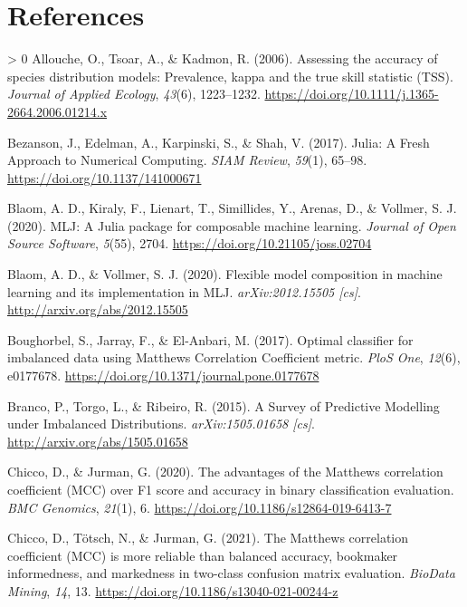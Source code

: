 \documentclass[11pt]{article}
\newlength{\cslhangindent}
\newenvironment{CSLReferences}[3] %
 {%
  \setlength{\parindent}{0pt}
  \ifodd #1 \everypar{\setlength{\hangindent}{\cslhangindent}}\ignorespaces\fi
  \ifnum #2 > 0
  \setlength{\parskip}{#2\baselineskip}
  \fi
 }%
 {}
\begin{document}
\hypertarget{references}{%
\section*{References}\label{references}}

\hypertarget{refs}{}
\begin{CSLReferences}{1}{0}
\leavevmode\hypertarget{ref-Allouche2006AssAcc}{}%
Allouche, O., Tsoar, A., \& Kadmon, R. (2006). Assessing the accuracy of
species distribution models: Prevalence, kappa and the true skill
statistic (TSS). \emph{Journal of Applied Ecology}, \emph{43}(6),
1223--1232. \url{https://doi.org/10.1111/j.1365-2664.2006.01214.x}

\leavevmode\hypertarget{ref-Bezanson2017JulFre}{}%
Bezanson, J., Edelman, A., Karpinski, S., \& Shah, V. (2017). Julia: A
Fresh Approach to Numerical Computing. \emph{SIAM Review}, \emph{59}(1),
65--98. \url{https://doi.org/10.1137/141000671}

\leavevmode\hypertarget{ref-Blaom2020MljJul}{}%
Blaom, A. D., Kiraly, F., Lienart, T., Simillides, Y., Arenas, D., \&
Vollmer, S. J. (2020). MLJ: A Julia package for composable machine
learning. \emph{Journal of Open Source Software}, \emph{5}(55), 2704.
\url{https://doi.org/10.21105/joss.02704}

\leavevmode\hypertarget{ref-Blaom2020FleMod}{}%
Blaom, A. D., \& Vollmer, S. J. (2020). Flexible model composition in
machine learning and its implementation in MLJ. \emph{arXiv:2012.15505
{[}cs{]}}. \url{http://arxiv.org/abs/2012.15505}

\leavevmode\hypertarget{ref-Boughorbel2017OptCla}{}%
Boughorbel, S., Jarray, F., \& El-Anbari, M. (2017). Optimal classifier
for imbalanced data using Matthews Correlation Coefficient metric.
\emph{PloS One}, \emph{12}(6), e0177678.
\url{https://doi.org/10.1371/journal.pone.0177678}

\leavevmode\hypertarget{ref-Branco2015SurPre}{}%
Branco, P., Torgo, L., \& Ribeiro, R. (2015). A Survey of Predictive
Modelling under Imbalanced Distributions. \emph{arXiv:1505.01658
{[}cs{]}}. \url{http://arxiv.org/abs/1505.01658}

\leavevmode\hypertarget{ref-Chicco2020AdvMat}{}%
Chicco, D., \& Jurman, G. (2020). The advantages of the Matthews
correlation coefficient (MCC) over F1 score and accuracy in binary
classification evaluation. \emph{BMC Genomics}, \emph{21}(1), 6.
\url{https://doi.org/10.1186/s12864-019-6413-7}

\leavevmode\hypertarget{ref-Chicco2021MatCor}{}%
Chicco, D., Tötsch, N., \& Jurman, G. (2021). The Matthews correlation
coefficient (MCC) is more reliable than balanced accuracy, bookmaker
informedness, and markedness in two-class confusion matrix evaluation.
\emph{BioData Mining}, \emph{14}, 13.
\url{https://doi.org/10.1186/s13040-021-00244-z}


\end{CSLReferences}
\end{document}
